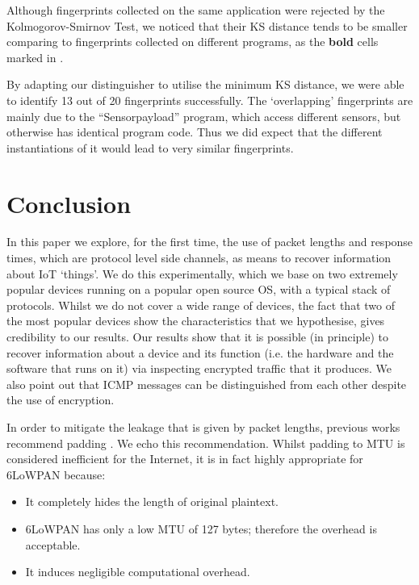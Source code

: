 \documentclass{article}
\begin{document}
Although fingerprints collected on the same application were rejected by the Kolmogorov-Smirnov Test, we noticed that their KS distance tends to be smaller comparing to fingerprints collected on different programs, as the \textbf{bold} cells marked in . 

By adapting our distinguisher to utilise the minimum KS distance, we were able to identify 13 out of 20 fingerprints successfully. The `overlapping' fingerprints are mainly due to the ``Sensorpayload'' program, which access different sensors, but otherwise has identical program code. Thus we did expect that the different instantiations of it would lead to very similar fingerprints. 

\section{Conclusion\label{sec: Conclusion}}

In this paper we explore, for the first time, the use of packet lengths and response times, which are protocol level side channels, as means to recover information about IoT `things'. We do this experimentally, which we base on two extremely popular devices running on a popular open source OS, with a typical stack of protocols. Whilst we do not cover a wide range of devices, the fact that two of the most popular devices show the characteristics that we hypothesise, gives credibility to our results. Our results show that it is possible (in principle) to recover information about a device and its function (i.e. the hardware and the software that runs on it) via inspecting encrypted traffic that it produces. We also point out that ICMP messages can be distinguished from each other despite the use of encryption. 

In order to mitigate the leakage that is given by packet lengths, previous works recommend padding \cite{Peekaboo}. We echo this recommendation. Whilst padding to MTU is considered inefficient for the Internet, it is in fact highly appropriate for 6LoWPAN because:
\begin{itemize}
	\item It completely hides the length of original plaintext.
	\item 6LoWPAN has only a low MTU of 127 bytes; therefore the overhead is acceptable.
	\item It induces negligible computational overhead.
\end{itemize}

\end{document}
